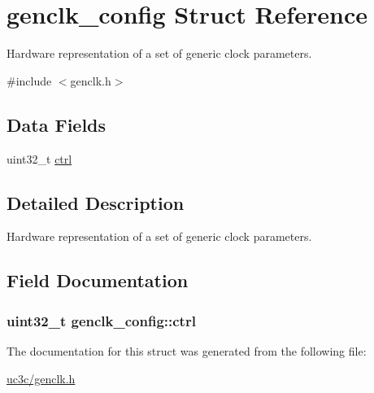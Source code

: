 \hypertarget{structgenclk__config}{
\section{genclk\-\_\-config \-Struct \-Reference}
\label{structgenclk__config}
}


\-Hardware representation of a set of generic clock parameters.  




{\ttfamily \#include $<$genclk.\-h$>$}

\subsection*{\-Data \-Fields}
\begin{DoxyCompactItemize}
\item 
uint32\-\_\-t \hyperlink{structgenclk__config_a627f2d3129c376569dd181a3f69db17b}{ctrl}
\end{DoxyCompactItemize}


\subsection{\-Detailed \-Description}
\-Hardware representation of a set of generic clock parameters. 

\subsection{\-Field \-Documentation}
\hypertarget{structgenclk__config_a627f2d3129c376569dd181a3f69db17b}{
\subsubsection[{ctrl}]{\setlength{\rightskip}{0pt plus 5cm}uint32\-\_\-t {\bf genclk\-\_\-config\-::ctrl}}}
\label{structgenclk__config_a627f2d3129c376569dd181a3f69db17b}


\-The documentation for this struct was generated from the following file\-:\begin{DoxyCompactItemize}
\item 
\hyperlink{uc3c_2genclk_8h}{uc3c/genclk.\-h}\end{DoxyCompactItemize}
